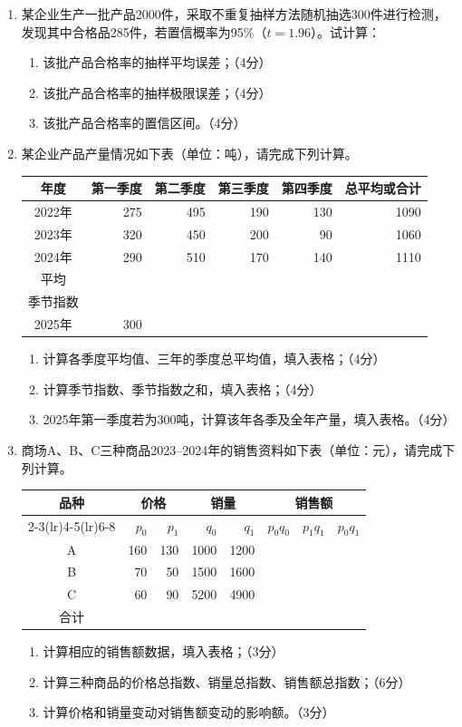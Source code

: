 \documentclass[UTF8,a4paper,10pt]{ctexart}
\newcommand{\sect}[1]{\par\smallskip\noindent\fcolorbox{black}{black!4}{\parbox{\dimexpr\linewidth-2\fboxsep-2\fboxrule}{\sffamily\bfseries #1}}\par\smallskip}
\begin{document}
\sect{四、计算题}
\begin{enumerate}[start=26]
\item 某企业生产一批产品2000件，采取不重复抽样方法随机抽选300件进行检测，发现其中合格品285件，若置信概率为95\%（$t=1.96$）。试计算：
\begin{enumerate}[label=（\arabic*）,leftmargin=2.8em]\item 该批产品合格率的抽样平均误差；（4分）\item 该批产品合格率的抽样极限误差；（4分）\item 该批产品合格率的置信区间。（4分）\end{enumerate}
\item 某企业产品产量情况如下表（单位：吨），请完成下列计算。
\begin{center}\begin{tabular}{crrrrr}\toprule 年度&第一季度&第二季度&第三季度&第四季度&总平均或合计\\\midrule2022年&275&495&190&130&1090\\2023年&320&450&200&90&1060\\2024年&290&510&170&140&1110\\平均&&&&&\\季节指数&&&&&\\2025年&300&&&&\\\bottomrule\end{tabular}\end{center}
\begin{enumerate}[label=（\arabic*）,leftmargin=2.8em]\item 计算各季度平均值、三年的季度总平均值，填入表格；（4分）\item 计算季节指数、季节指数之和，填入表格；（4分）\item 2025年第一季度若为300吨，计算该年各季及全年产量，填入表格。（4分）\end{enumerate}
\item 商场A、B、C三种商品2023--2024年的销售资料如下表（单位：元），请完成下列计算。
\begin{center}\begin{tabular}{crrrrrrr}\toprule\multirow{2}{*}{品种}&\multicolumn{2}{c}{价格}&\multicolumn{2}{c}{销量}&\multicolumn{3}{c}{销售额}\\\cmidrule(lr){2-3}\cmidrule(lr){4-5}\cmidrule(lr){6-8}&$p_0$&$p_1$&$q_0$&$q_1$&$p_0q_0$&$p_1q_1$&$p_0q_1$\\\midrule A&160&130&1000&1200&&&\\B&70&50&1500&1600&&&\\C&60&90&5200&4900&&&\\合计&&&&&&&\\\bottomrule\end{tabular}\end{center}
\begin{enumerate}[label=（\arabic*）,leftmargin=2.8em]\item 计算相应的销售额数据，填入表格；（3分）\item 计算三种商品的价格总指数、销量总指数、销售额总指数；（6分）\item 计算价格和销量变动对销售额变动的影响额。（3分）\end{enumerate}
\end{enumerate}
\end{document}
